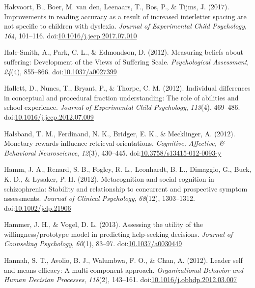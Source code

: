 \documentclass[english,man]{apa6}
\theoremstyle{definition}
\theoremstyle{definition}
\theoremstyle{definition}
\theoremstyle{remark}
\begin{document}
\hypertarget{ref-Hakvoort2017}{}
Hakvoort, B., Boer, M. van den, Leenaars, T., Bos, P., \& Tijms, J.
(2017). Improvements in reading accuracy as a result of increased
interletter spacing are not specific to children with dyslexia.
\emph{Journal of Experimental Child Psychology}, \emph{164}, 101--116.
doi:\href{https://doi.org/10.1016/j.jecp.2017.07.010}{10.1016/j.jecp.2017.07.010}

\hypertarget{ref-Hale-Smith2012}{}
Hale-Smith, A., Park, C. L., \& Edmondson, D. (2012). Measuring beliefs
about suffering: Development of the Views of Suffering Scale.
\emph{Psychological Assessment}, \emph{24}(4), 855--866.
doi:\href{https://doi.org/10.1037/a0027399}{10.1037/a0027399}

\hypertarget{ref-Hallett2012}{}
Hallett, D., Nunes, T., Bryant, P., \& Thorpe, C. M. (2012). Individual
differences in conceptual and procedural fraction understanding: The
role of abilities and school experience. \emph{Journal of Experimental
Child Psychology}, \emph{113}(4), 469--486.
doi:\href{https://doi.org/10.1016/j.jecp.2012.07.009}{10.1016/j.jecp.2012.07.009}

\hypertarget{ref-Halsband2012}{}
Halsband, T. M., Ferdinand, N. K., Bridger, E. K., \& Mecklinger, A.
(2012). Monetary rewards influence retrieval orientations.
\emph{Cognitive, Affective, \& Behavioral Neuroscience}, \emph{12}(3),
430--445.
doi:\href{https://doi.org/10.3758/s13415-012-0093-y}{10.3758/s13415-012-0093-y}

\hypertarget{ref-Hamm2012}{}
Hamm, J. A., Renard, S. B., Fogley, R. L., Leonhardt, B. L., Dimaggio,
G., Buck, K. D., \& Lysaker, P. H. (2012). Metacognition and social
cognition in schizophrenia: Stability and relationship to concurrent and
prospective symptom assessments. \emph{Journal of Clinical Psychology},
\emph{68}(12), 1303--1312.
doi:\href{https://doi.org/10.1002/jclp.21906}{10.1002/jclp.21906}

\hypertarget{ref-Hammer2013}{}
Hammer, J. H., \& Vogel, D. L. (2013). Assessing the utility of the
willingness/prototype model in predicting help-seeking decisions.
\emph{Journal of Counseling Psychology}, \emph{60}(1), 83--97.
doi:\href{https://doi.org/10.1037/a0030449}{10.1037/a0030449}

\hypertarget{ref-Hannah2012}{}
Hannah, S. T., Avolio, B. J., Walumbwa, F. O., \& Chan, A. (2012).
Leader self and means efficacy: A multi-component approach.
\emph{Organizational Behavior and Human Decision Processes},
\emph{118}(2), 143--161.
doi:\href{https://doi.org/10.1016/j.obhdp.2012.03.007}{10.1016/j.obhdp.2012.03.007}
\end{document}
